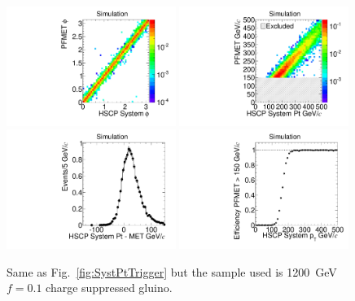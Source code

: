 \begin{figure}
  \begin{center}
      \includegraphics[clip=false, trim=0.0cm 0cm 0.0cm 0cm, width=0.49\textwidth]{figures/search/Gluino_8TeV_M1200N_f10SystPhiMET}
      \includegraphics[clip=false, trim=0.0cm 0cm 0.0cm 0cm, width=0.49\textwidth]{figures/search/Gluino_8TeV_M1200N_f10SystPtMET} \\
      \includegraphics[clip=false, trim=0.0cm 0cm 0.0cm 0cm, width=0.49\textwidth]{figures/search/Gluino_8TeV_M1200N_f10SystPtDiffMET}
      \includegraphics[clip=false, trim=0.0cm 0cm 0.0cm 0cm, width=0.49\textwidth]{figures/search/Gluino_8TeV_M1200N_f10SystPtEff}
      \caption[Comparison of di-HSCP system $\phi$ and \pt\ with PFMET for a 1200~GeV
gluino $f=0.1$ charge suppressed sample in events with at least 150~GeV of PFMET]
      {Same as Fig.~\ref{fig:SystPtTrigger} but the sample used is 1200~GeV $f=0.1$ charge suppressed gluino.
        }
      \label{fig:SystPtTriggerN}
  \end{center}
\end{figure}

